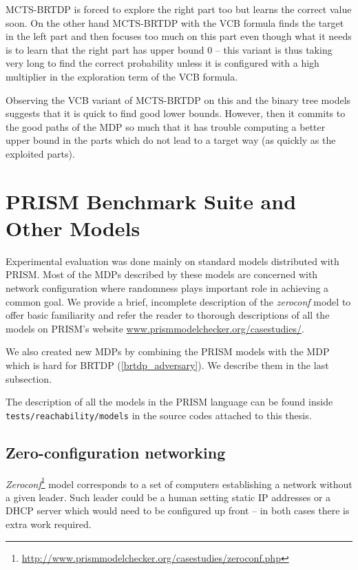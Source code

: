 MCTS-BRTDP is forced to explore the right part too but learns the
correct value soon. On the other hand MCTS-BRTDP with the VCB formula
finds the target in the left part and then focuses too much on this part
even though what it needs is to learn that the right part has upper
bound 0 -- this variant is thus taking very long to find the correct
probability unless it is configured with a high multiplier in the
exploration term of the VCB formula.

Observing the VCB variant of MCTS-BRTDP on this and the binary tree
models suggests that it is quick to find good lower bounds. However,
then it commits to the good paths of the MDP so much that it has trouble
computing a better upper bound in the parts which do not lead to a
target way (as quickly as the exploited parts).

\section{PRISM Benchmark Suite and Other Models}

Experimental evaluation was done mainly on standard models
distributed with PRISM. Most of the MDPs described by these models are
concerned with network configuration where randomness plays important
role in achieving a common goal. We provide a brief, incomplete
description of the {\em zeroconf} model to offer basic familiarity and
refer the reader to thorough descriptions of all the models on PRISM's
website
\href{http://www.prismmodelchecker.org/casestudies/}{www.prismmodelchecker.org/casestudies/}.

We also created new MDPs by combining the PRISM models with the MDP
which is hard for BRTDP (\autoref{brtdp_adversary}). We describe them in
the last subsection.

The description of all the models in the PRISM language can be found inside
\verb|tests/reachability/models| in the source codes attached to this
thesis.

\subsection*{Zero-configuration networking}

{\em
Zeroconf}\footnote{\href{http://www.prismmodelchecker.org/casestudies/zeroconf.php}{http://www.prismmodelchecker.org/casestudies/zeroconf.php}} model corresponds to a set of computers establishing a
network without a given leader. Such leader could be a human setting
static IP addresses or a DHCP server which would need to be configured
up front -- in both cases there is extra work required.

